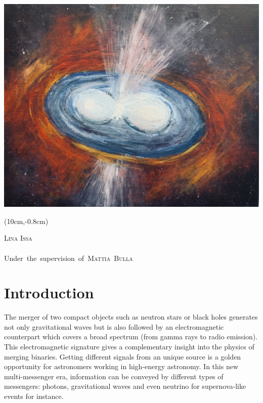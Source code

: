 \documentclass[a4paper, twoside, 11pt]{article}
\numberwithin{equation}{section}
\begin{document}
\begin{center}
\begin{center}
\includegraphics[width=0.5\paperwidth]{pictures/merger_NS.jpeg}
\end{center}
\begin{textblock*}{4cm}(10cm,-0.8cm)
\textcolor{white}{\tiny{credits: Digital drawing by Robin Dienel}}
\end{textblock*}
%


\vspace{10pt}

\LARGE \textsc{Lina Issa} \\
\vspace{10 pt}
\\ 

\vspace{10 pt}
\mbox{\LARGE Under the supervision of \textsc{Mattia Bulla}}

\end{center}


\newpage

\section*{Introduction}

\hspace{\parindent}		The merger of two compact objects such as neutron stars or black holes generates not only gravitational waves but is also followed by an electromagnetic counterpart which covers a broad spectrum (from gamma rays to radio emission). This electromagnetic signature gives a complementary insight into the physics of merging binaries. Getting different signals from an unique source is a golden opportunity for astronomers working in high-energy astronomy.  In this new multi-messenger era, information can be conveyed by different types of messengers: photons, gravitational waves and even neutrino for supernova-like events for instance.\\
\end{document}
